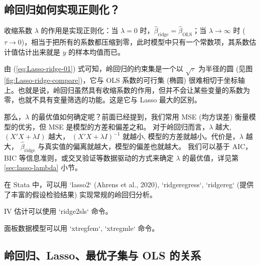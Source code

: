 \subsection{岭回归如何实现正则化？}

收缩系数 $\lambda$ 的作用是实现正则化：当 $\lambda=0$ 时，$\widehat{\beta}_{\text {ridge}}=\widehat{\beta}_{\text {OLS}}$；当 $\lambda \to \infty$ 时 ($\tau \to 0$)，相当于把所有的系数都压缩到零，此时模型中只有一个常数项，其系数估计值估计出来就是 $y$ 的样本均值而已。

由 (\ref{eq:Lasso-ridge-01}) 式可知，岭回归的约束集是一个以 $\sqrt{\tau}$ 为半径的圆 (见图 \ref{fig:Lasso-ridge-compare})，它与 OLS 系数的可行集 (椭圆) 很难相切于坐标轴上。也就是说，岭回归虽然具有收缩系数的作用，但并不会让某些变量的系数为零，也就不具有变量筛选的功能。这是它与 Lasso 最大的区别。   

那么，$\lambda$ 的最优值如何确定呢？前面已经提到，我们常用 MSE (均方误差) 衡量模型的优劣，但 MSE 是模型的方差和偏差之和。
对于岭回归而言，$\lambda$ 越大, $(X'X+\lambda I)$ 越大， $\left(X'X+\lambda I\right)^{-1}$ 就越小, 模型的方差就越小。代价是，$\lambda$ 越大， $\widehat{\beta}_{\text {ridge}}$ 与真实值的偏离就越大，模型的偏差也就越大。
我们可以基于 AIC，BIC 等信息准则，或交叉验证等数据驱动的方式来确定 $\lambda$ 的最优值，详见第 \ref{sec:lasso-lambda} 小节。

在 Stata 中，可以用 `lasso2` (Ahrens et al., 2020), `ridgeregress`, `ridgereg` (提供了丰富的假设检验结果) 实现常规的岭回归分析。

IV 估计可以使用 `ridge2sls` 命令。 

面板数据模型可以用 `xtregfem`, `xtregmle` 命令。 

\subsection{岭回归、Lasso、最优子集与 OLS 的关系}



